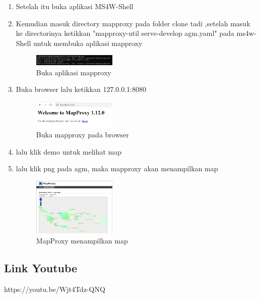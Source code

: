 \begin{enumerate}
  \item Setelah itu buka aplikasi MS4W-Shell
  \item Kemudian masuk directory mapproxy pada folder clone tadi ,setelah masuk ke directorinya ketikkan "mapproxy-util serve-develop agm.yaml" pada ms4w-Shell untuk membuka aplikasi mapproxy
  \hfill\break
  \begin{figure}[H]
  \includegraphics[width=4cm]{figures/Tugas4/1174084/14.png}
  \centering
  \caption{Buka aplikasi mapproxy}
  \end{figure}

  \item Buka browser lalu ketikkan 127.0.0.1:8080
  \hfill\break
  \begin{figure}[H]
  \includegraphics[width=4cm]{figures/Tugas4/1174084/15.png}
  \centering
  \caption{Buka mapproxy pada browser}
  \end{figure}

  \item lalu klik demo untuk melihat map
  \item lalu klik png pada agm, maka mapproxy akan menampilkan map
  \hfill\break
  \begin{figure}[H]
  \includegraphics[width=4cm]{figures/Tugas4/1174084/16.png}
  \centering
  \caption{MapProxy menampilkan map}
  \end{figure}

\end{enumerate}

\subsection{Link Youtube}
https://youtu.be/Wjt4Tdz-QNQ